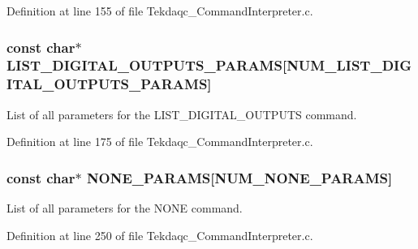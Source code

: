 Definition at line 155 of file Tekdaqc\-\_\-\-Command\-Interpreter.\-c.

\hypertarget{group__command__interpreter_gad3444869609f37e2fcb9ca55ac0b53ef}{
\subsubsection[{L\-I\-S\-T\-\_\-\-D\-I\-G\-I\-T\-A\-L\-\_\-\-O\-U\-T\-P\-U\-T\-S\-\_\-\-P\-A\-R\-A\-M\-S}]{\setlength{\rightskip}{0pt plus 5cm}const char$\ast$ L\-I\-S\-T\-\_\-\-D\-I\-G\-I\-T\-A\-L\-\_\-\-O\-U\-T\-P\-U\-T\-S\-\_\-\-P\-A\-R\-A\-M\-S\mbox{[}{\bf N\-U\-M\-\_\-\-L\-I\-S\-T\-\_\-\-D\-I\-G\-I\-T\-A\-L\-\_\-\-O\-U\-T\-P\-U\-T\-S\-\_\-\-P\-A\-R\-A\-M\-S}\mbox{]}}}\label{group__command__interpreter_gad3444869609f37e2fcb9ca55ac0b53ef}
List of all parameters for the L\-I\-S\-T\-\_\-\-D\-I\-G\-I\-T\-A\-L\-\_\-\-O\-U\-T\-P\-U\-T\-S command. 

Definition at line 175 of file Tekdaqc\-\_\-\-Command\-Interpreter.\-c.

\hypertarget{group__command__interpreter_gae6bcf7679336081f08e81ef76a680c81}{
\subsubsection[{N\-O\-N\-E\-\_\-\-P\-A\-R\-A\-M\-S}]{\setlength{\rightskip}{0pt plus 5cm}const char$\ast$ N\-O\-N\-E\-\_\-\-P\-A\-R\-A\-M\-S\mbox{[}{\bf N\-U\-M\-\_\-\-N\-O\-N\-E\-\_\-\-P\-A\-R\-A\-M\-S}\mbox{]}}}\label{group__command__interpreter_gae6bcf7679336081f08e81ef76a680c81}
List of all parameters for the N\-O\-N\-E command. 

Definition at line 250 of file Tekdaqc\-\_\-\-Command\-Interpreter.\-c.

